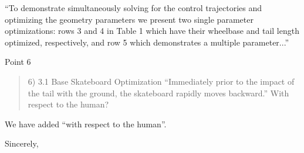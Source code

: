 \documentclass{letter}
\begin{document}
\begin{letter}{}
``To demonstrate simultaneously solving for the control trajectories and optimizing the geometry parameters we present two single parameter optimizations: rows 3 and 4 in Table 1 which have their wheelbase and tail length optimized, respectively, and row 5 which demonstrates a multiple parameter...''

Point 6

\begin{quote}
    6) 3.1 Base Skateboard Optimization ``Immediately prior to the impact of the tail with the ground, the skateboard rapidly moves backward.'' With respect to the human?
\end{quote}

We have added ``with respect to the human''.

\closing{Sincerely,}

\end{letter}
\end{document}
